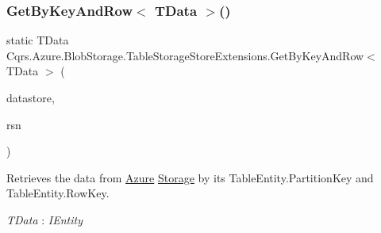 \subsubsection{\texorpdfstring{Get\+By\+Key\+And\+Row$<$ T\+Data $>$()}{GetByKeyAndRow< TData >()}}
{\footnotesize\ttfamily static T\+Data Cqrs.\+Azure.\+Blob\+Storage.\+Table\+Storage\+Store\+Extensions.\+Get\+By\+Key\+And\+Row$<$ T\+Data $>$ (\begin{DoxyParamCaption}\item[{this \hyperlink{interfaceCqrs_1_1DataStores_1_1IDataStore}{I\+Data\+Store}$<$ T\+Data $>$}]{datastore,  }\item[{Guid}]{rsn }\end{DoxyParamCaption})\hspace{0.3cm}{\ttfamily [static]}}



Retrieves the data from \hyperlink{namespaceCqrs_1_1Azure}{Azure} \hyperlink{namespaceCqrs_1_1Azure_1_1Storage}{Storage} by it\textquotesingle{}s Table\+Entity.\+Partition\+Key and Table\+Entity.\+Row\+Key. 

\begin{Desc}
\item[Type Constraints]\begin{description}
\item[{\em T\+Data} : {\em I\+Entity}]\end{description}
\end{Desc}
